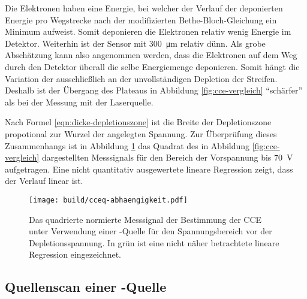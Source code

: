 Die Elektronen haben eine Energie, bei welcher der Verlauf der deponierten Energie
pro Wegstrecke nach der modifizierten Bethe-Bloch-Gleichung ein Minimum aufweist.
Somit deponieren die Elektronen relativ wenig Energie im Detektor.
Weiterhin ist der Sensor mit \SI{300}{\micro\meter} relativ dünn.
Als grobe Abschätzung kann also angenommen werden, dass die Elektronen auf dem
Weg durch den Detektor überall die selbe Energiemenge deponieren.
Somit hängt die Variation der \si{\adc} ausschließlich an der unvollständigen
Depletion der Streifen. Deshalb ist der Übergang des Plateaus in Abbildung
\ref{fig:cce-vergleich} \enquote{schärfer} als bei der Messung mit der Laserquelle.

Nach Formel \eqref{eqn:dicke-depletionszone} ist die Breite der Depletionszone
propotional zur Wurzel der angelegten Spannung.
Zur Überprüfung dieses Zusammenhangs ist in Abbildung \ref{fig:cceq-abhaengigkeit}
das Quadrat des in Abbildung \ref{fig:cce-vergleich} dargestellten Messsignals
für den Bereich der Vorspannung bis \SI{70}{\volt} aufgetragen.
Eine nicht quantitativ ausgewertete lineare Regression zeigt, dass der Verlauf
linear ist.
\begin{figure}
  \centering
  \texttt{[image: build/cceq-abhaengigkeit.pdf]}  %
  \caption{Das quadrierte normierte Messsignal der Bestimmung der CCE unter Verwendung
  einer -Quelle für den Spannungsbereich vor der Depletionsspannung.
  In grün ist eine nicht näher betrachtete lineare Regression eingezeichnet.}
  \label{fig:cceq-abhaengigkeit}
\end{figure}

\FloatBarrier
\subsection{Quellenscan einer \texorpdfstring{}{Sr}-Quelle}
\label{sec:Quellenscan-Auswertung}

